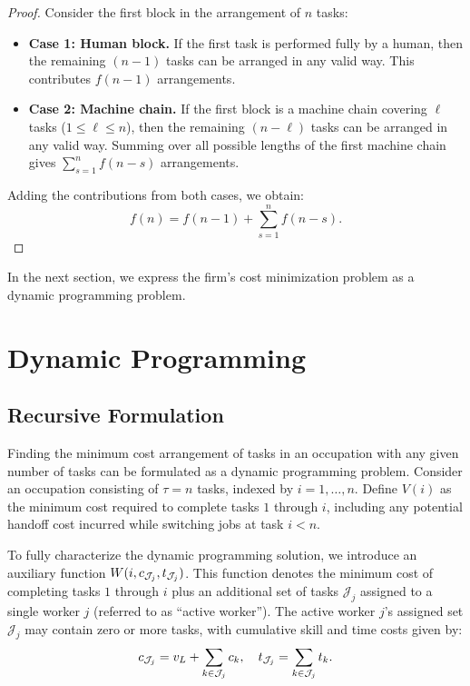 \documentclass{article}
\theoremstyle{plain}
\theoremstyle{plain}
\begin{document}
\begin{proof}
Consider the first block in the arrangement of \(n\) tasks:
\begin{itemize}
    \item \textbf{Case 1: Human block.} If the first task is performed fully by a human, then the remaining \((n-1)\) tasks can be arranged in any valid way. This contributes \(f(n-1)\) arrangements.
    \item \textbf{Case 2: Machine chain.} If the first block is a machine chain covering \(\ell\) tasks (\(1 \leq \ell \leq n\)), then the remaining \((n-\ell)\) tasks can be arranged in any valid way. Summing over all possible lengths of the first machine chain gives \(\sum_{s=1}^{n} f(n-s)\) arrangements.
\end{itemize}
Adding the contributions from both cases, we obtain:
\[
f(n) = f(n-1) + \sum_{s=1}^{n} f(n-s).
\]
\end{proof}

In the next section, we express the firm's cost minimization problem as a dynamic programming problem.




\section{Dynamic Programming}
\subsection{Recursive Formulation}
\label{sec:recursive_formulation}
Finding the minimum cost arrangement of tasks in an occupation with any given number of tasks can be formulated as a dynamic programming problem.
Consider an occupation consisting of $\tau=n$ tasks, indexed by $i = 1,\dots,n$.
Define $V(i)$ as the minimum cost required to complete tasks $1$ through $i$, including any potential handoff cost incurred while switching jobs at task $i < n$.

To fully characterize the dynamic programming solution, we introduce an auxiliary function $W(i, c_{\mathcal{J}_j}, t_{\mathcal{J}_j})$.
This function denotes the minimum cost of completing tasks $1$ through $i$ plus an additional set of tasks $\mathcal{J}_j$ assigned to a single worker $j$ (referred to as ``active worker'').
The active worker $j$'s assigned set $\mathcal{J}_j$ may contain zero or more tasks, with cumulative skill and time costs given by:
\[
c_{\mathcal{J}_j} = v_L + \sum_{k \in \mathcal{J}_j} c_{k}, 
\quad
t_{\mathcal{J}_j} = \sum_{k \in \mathcal{J}_j} t_{k}.
\]
\end{document}

